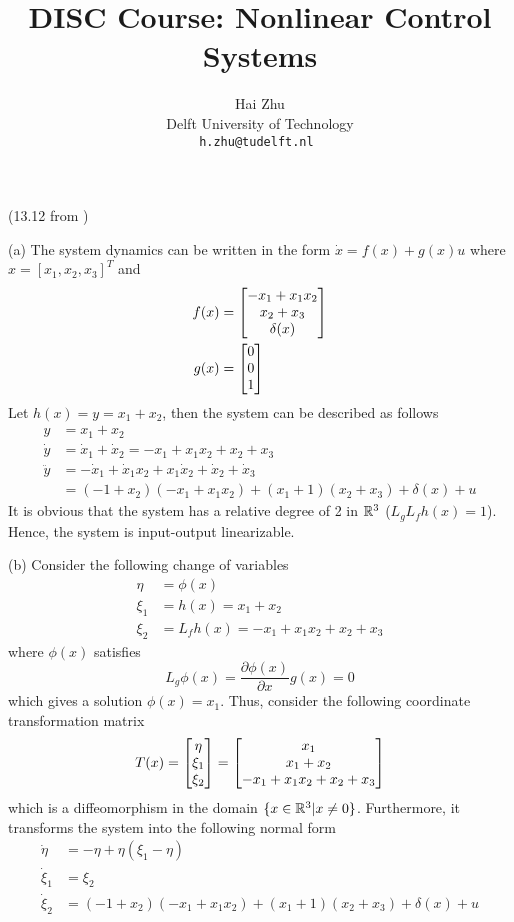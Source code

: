 \documentclass[a4 paper, 12pt]{article}
\title{
        \Large{DISC Course: Nonlinear Control Systems}\\
        \vspace{1em}
        \large\tb{Assignment 3}
}
\author{
        \small Hai Zhu                          \\
        \small Delft University of Technology   \\
        \tt\small h.zhu@tudelft.nl
 }
\date{\small\ti{Monday 26 February 2018}}
\begin{document}
\maketitle


 (13.12 from \cite{c1})

(a) The system dynamics can be written in the form $\dot{x} = f(x) + g(x)u$ where $x = [x_1,x_2,x_3]^T$ and 
\begin{align}
        f(x) &= \begin{bmatrix} -x_1+x_1x_2 \\ x_2+x_3 \\ \delta(x) \end{bmatrix} \\
        g(x) &= \begin{bmatrix} 0 \\ 0 \\ 1 \end{bmatrix}
\end{align}
Let $ h(x) = y = x_1 + x_2$, then the system can be described as follows
\begin{align}
        y &= x_1 + x_2 \\
        \dot{y} &= \dot{x}_1 + \dot{x}_2 = -x_1+x_1x_2+x_2+x_3 \\
        \ddot{y} &= -\dot{x}_1 + \dot{x}_1x_2 + x_1\dot{x}_2 + \dot{x}_2 + \dot{x}_3 \\
        &= (-1+x_2)(-x_1+x_1x_2) +(x_1+1)(x_2+x_3)+\delta(x)+u
\end{align}
It is obvious that the system has a relative degree of 2 in $\mathbb{R}^3$ ($L_gL_fh(x) = 1$). Hence, the system is input-output linearizable.

(b) Consider the following change of variables
\begin{align}
        \eta &= \phi(x) \\
        \xi_1 &= h(x) = x_1+x_2 \\
        \xi_2 &= L_fh(x) = -x_1+x_1x_2+x_2+x_3
\end{align}
where $\phi(x)$ satisfies
\begin{equation}
        L_g\phi(x) = \frac{\partial\phi(x)}{\partial x}g(x) = 0
\end{equation}
which gives a solution $\phi(x) = x_1$. Thus, consider the following coordinate transformation matrix
\begin{equation}
        T(x) = \begin{bmatrix} \eta \\ \xi_1 \\ \xi_2 \end{bmatrix} = \begin{bmatrix} x_1 \\ x_1+x_2 \\ -x_1+x_1x_2+x_2+x_3 \end{bmatrix}
\end{equation}
which is a diffeomorphism in the domain $\{ x\in\mathbb{R}^3 | x\neq0 \}$. Furthermore, it transforms the system into the following normal form 
\begin{align}
        \dot\eta &= -\eta + \eta(\xi_1-\eta) \\
        \dot\xi_1 &= \xi_2 \\
        \dot\xi_2 &= (-1+x_2)(-x_1+x_1x_2) +(x_1+1)(x_2+x_3)+\delta(x)+u
\end{align}
\end{document}
